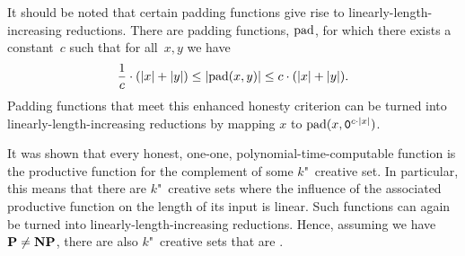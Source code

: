 It should be noted that certain padding functions give rise to linearly-length-increasing reductions.
There are padding functions, $\operatorname{pad}$, for which there exists a constant~$c$ such that for all~$x, y$ we have
\begin{equation*}
  \frac{1}{c} \cdot ({\lvert x\rvert} + {\lvert y\rvert}) \le {\lvert\operatorname{pad}(x, y)\rvert} \le c \cdot ({\lvert x\rvert} + {\lvert y\rvert}).
\end{equation*}
Padding functions that meet this enhanced honesty criterion can be turned into linearly-length-increasing reductions by mapping $x$ to $\operatorname{pad}(x, \textnormal{\texttt{0}}^{c \cdot {\lvert x\rvert}})$.

It was shown \parencite{young1983some} that every honest, one-one, polynomial-time-computable function is the productive function for the complement of some $k$"~creative set.
In particular, this means that there are $k$"~creative sets where the influence of the associated productive function on the length of its input is linear.
Such functions can again be turned into linearly-length-increasing reductions.
Hence, assuming we have $\textnormal{\textbf{P}} \neq \textnormal{\textbf{NP}}$, there are also $k$"~creative sets that are .

